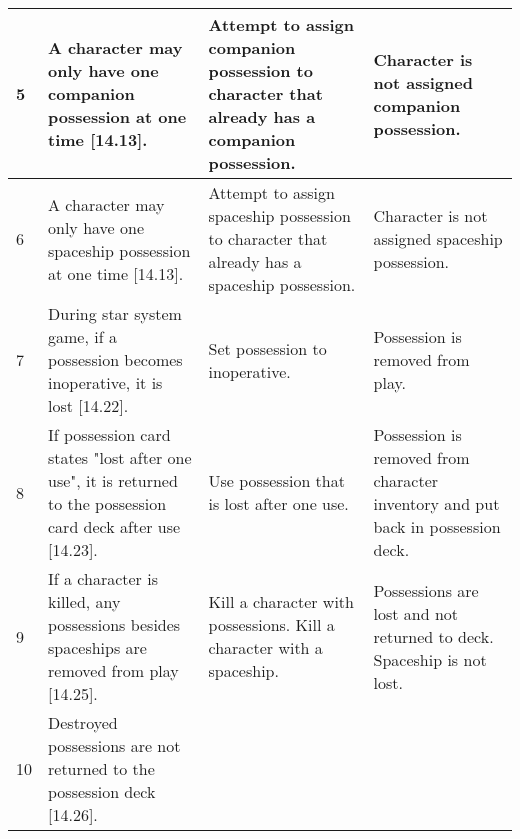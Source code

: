 \begin{center}
\begin{longtable}{| p{.5cm} | p{4.5cm} | p{4.5cm} | p{4.5cm} |}
    5 &
    
    A character may only have one companion possession at one time
    [14.13]. &

    Attempt to assign companion possession to character that already
    has a companion possession. &

    Character is not assigned companion possession. 

    \\ \hline 

    6 &
    
    A character may only have one spaceship possession at one time [14.13]. &

    Attempt to assign spaceship possession to character that already
    has a spaceship possession. &

    Character is not assigned spaceship possession. 
 
    \\ \hline

    7 &

    During star system game, if a possession becomes inoperative, it is
    lost [14.22]. &

    Set possession to inoperative. &

    Possession is removed from play. 

    \\ \hline 

    8 &

    If possession card states "lost after one use", it is returned to
    the possession card deck after use [14.23]. &

    Use possession that is lost after one use. &
    
    Possession is removed from character inventory and put back in
    possession deck.

    \\ \hline 

    9 &

    If a character is killed, any possessions besides spaceships are
    removed from play [14.25]. &

    Kill a character with possessions. Kill a character with a
    spaceship. &

    Possessions are lost and not returned to deck. Spaceship is not
    lost.
    
    \\ \hline

    10 &

    Destroyed possessions are not returned to the possession deck
    [14.26]. &


\end{longtable}
\end{center}
